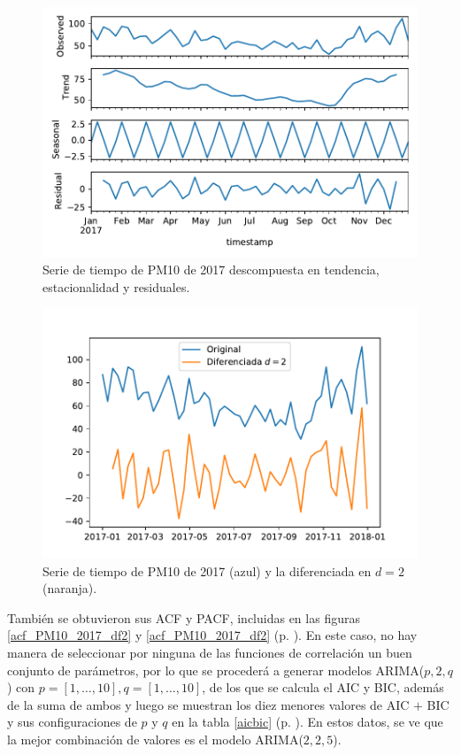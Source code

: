\documentclass{elsarticle}
\begin{document}
\begin{figure}
\centering
	\includegraphics[width=1\textwidth]{decompose_PM10_2017.pdf}
	\caption{Serie de tiempo de PM10 de 2017 descompuesta en tendencia, estacionalidad y residuales.}
	\label{decompose_PM10_2017}
\end{figure}

\begin{figure}
\centering
	\includegraphics[width=1\textwidth]{df_PM10_diff2.pdf}
	\caption{Serie de tiempo de PM10 de 2017 (azul) y la diferenciada en $d = 2$ (naranja).}
	\label{df_PM10_diff2}
\end{figure}

También se obtuvieron sus ACF y PACF, incluidas en las figuras \ref{acf_PM10_2017_df2} y \ref{acf_PM10_2017_df2} (p. \pageref{pacf_PM10_2017_df2}). En este caso, no hay manera de seleccionar por ninguna de las funciones de correlación un buen conjunto de parámetros, por lo que se procederá a generar modelos ARIMA($p, 2, q$) con $p = [1, \ldots, 10], q = [1, \ldots, 10]$, de los que se calcula el AIC y BIC, además de la suma de ambos y luego se muestran los diez menores valores de AIC $+$ BIC y sus configuraciones de $p$ y $q$ en la tabla \ref{aicbic} (p. \pageref{aicbic}). En estos datos, se ve que la mejor combinación de valores es el modelo ARIMA($2, 2, 5$).
\end{document}

